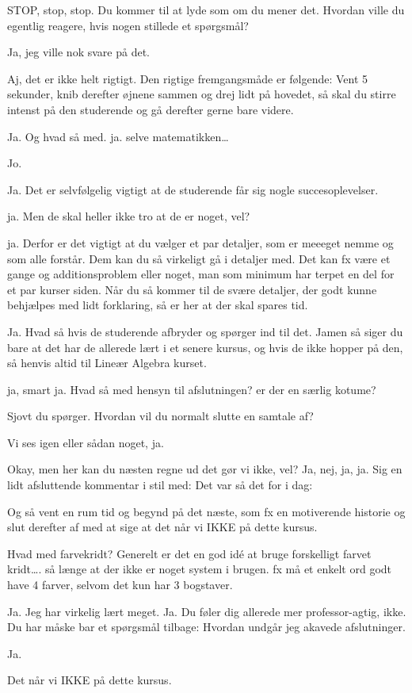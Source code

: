 \documentclass[a4paper,11pt]{article}
\begin{document}
\begin{sketch}
  STOP, stop, stop. Du kommer til at lyde som om du mener det. Hvordan ville du egentlig reagere, hvis nogen stillede et spørgsmål?

  Ja, jeg ville nok svare på det.

  Aj, det er ikke helt rigtigt. Den rigtige fremgangsmåde er følgende: Vent 5 sekunder, knib derefter øjnene sammen og drej lidt på hovedet, så skal du stirre intenst på den studerende og gå derefter gerne bare videre.

  Ja. Og hvad så med. ja. selve matematikken…

 Jo.

  Ja.
  Det er selvfølgelig vigtigt at de studerende får sig nogle succesoplevelser.

 ja.
Men de skal heller ikke tro at de er noget, vel?

ja.
 Derfor er det vigtigt at du vælger et par detaljer, som er meeeget nemme og som alle forstår. Dem kan du så virkeligt gå i detaljer med. Det kan fx være et gange og additionsproblem eller noget, man som minimum har terpet en del for et par kurser siden.
Når du så kommer til de svære detaljer, der godt kunne behjælpes med lidt forklaring, så er her at der skal spares tid.

  Ja. Hvad så hvis de studerende afbryder og spørger ind til det.
 Jamen så siger du bare at det har de allerede lært i et senere kursus, og hvis de ikke hopper på den, så henvis altid til Lineær Algebra kurset.

 ja, smart ja. Hvad så med hensyn til afslutningen? er der en særlig kotume?

Sjovt du spørger. Hvordan vil du normalt slutte en samtale af?

 Vi ses igen eller sådan noget, ja.

Okay, men her kan du næsten regne ud det gør vi ikke, vel?
 Ja, nej, ja, ja.
 Sig en lidt afsluttende kommentar i stil med: Det var så det for i dag:


 Og så vent en rum tid og begynd på det næste, som fx en motiverende historie og slut derefter af med at sige at det når vi IKKE på dette kursus.

Hvad med farvekridt?
  Generelt er det en god idé at bruge forskelligt farvet kridt…. så længe at der ikke er noget system i brugen. fx må et enkelt ord godt have 4 farver, selvom det kun har 3 bogstaver.

  Ja. Jeg har virkelig lært meget.
 Ja. Du føler dig allerede mer professor-agtig, ikke. Du har måske bar et spørgsmål tilbage: Hvordan undgår jeg akavede afslutninger.

 Ja.

 Det når vi IKKE på dette kursus.

\end{sketch}
\end{document}
